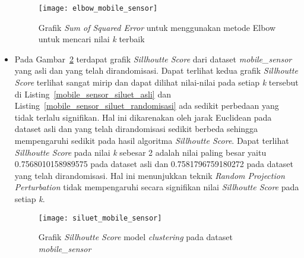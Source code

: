 \begin{itemize}
	\begin{figure}
		\centering
		\texttt{[image: elbow\_mobile\_sensor]}
		\caption{Grafik \textit{Sum of Squared Error} untuk menggunakan metode Elbow untuk mencari nilai \textit{k} terbaik}
		\label{fig:elbow_mobile_sensor}
	\end{figure}
	\item Pada Gambar~\ref{fig:siluet_mobile_sensor} terdapat grafik \textit{Sillhoutte Score} dari dataset \textit{mobile\_sensor} yang asli dan yang telah dirandomisasi. Dapat terlihat kedua grafik \textit{Sillhoutte Score} terlihat sangat mirip dan dapat dilihat nilai-nilai pada setiap \textit{k} tersebut di Listing~\ref{mobile_sensor_siluet_asli} dan Listing~\ref{mobile_sensor_siluet_randomisasi} ada sedikit perbedaan yang tidak terlalu signifikan. Hal ini dikarenakan oleh jarak Euclidean pada dataset asli dan yang telah dirandomisasi sedikit berbeda sehingga mempengaruhi sedikit pada hasil algoritma \textit{Sillhoutte Score}. Dapat terlihat \textit{Sillhoutte Score} pada nilai \textit{k} sebesar 2 adalah nilai paling besar yaitu 0.7568010158989575 pada dataset asli dan 0.7581796759180272 pada dataset yang telah dirandomisasi. Hal ini menunjukkan teknik \textit{Random Projection Perturbation} tidak mempengaruhi secara signifikan nilai \textit{Sillhoutte Score} pada setiap \textit{k}.

	\begin{figure}
		\centering
		\texttt{[image: siluet\_mobile\_sensor]}
		\caption{Grafik \textit{Sillhoutte Score} model \textit{clustering} pada dataset \textit{mobile\_sensor}}
		\label{fig:siluet_mobile_sensor}
	\end{figure}
	

\end{itemize}
